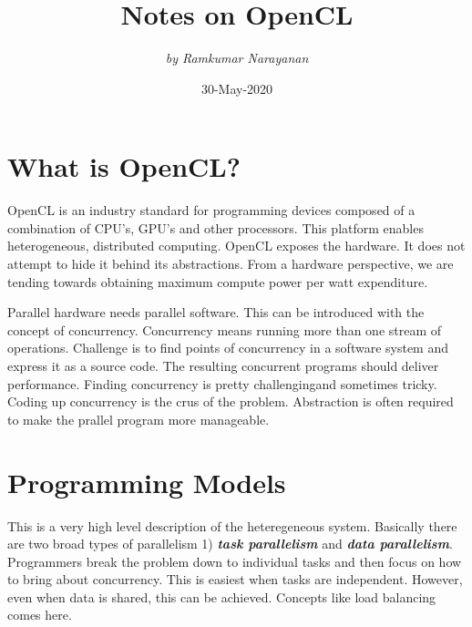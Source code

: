 \documentclass[10pt]{article}
\begin{document}
 
\title{\Huge \bsifamily Notes on OpenCL}
\author{\textit{by Ramkumar Narayanan}}
\date{}
\maketitle 
\tableofcontents
\newpage

{\color{red} \date{30-May-2020}}
\Large
\section{What is OpenCL?}
OpenCL is an industry standard for programming devices composed of a combination of CPU's, GPU's and other processors. This platform enables heterogeneous, distributed computing. OpenCL exposes the hardware. It does not attempt to hide it behind its abstractions. From a hardware perspective, we are tending towards obtaining maximum compute power per watt expenditure. 

Parallel hardware needs parallel software. This can be introduced with the concept of concurrency. Concurrency means running more than one stream of operations. Challenge is to find points of concurrency in a software system and express it as a source code. The resulting concurrent programs should deliver performance. Finding concurrency is pretty challengingand sometimes tricky. Coding up concurrency is the crus of the problem. Abstraction is often required to make the prallel program more manageable. 

\section{Programming Models}
This is a very high level description of the heteregeneous system. Basically there are two broad types of parallelism 1) \textit{\textbf{task parallelism}} and \textit{\textbf{data parallelism}}. Programmers break the problem down to individual tasks and then focus on how to bring about concurrency. This is easiest when tasks are independent. However, even when data is shared, this can be achieved. Concepts like load balancing comes here.
\end{document}
